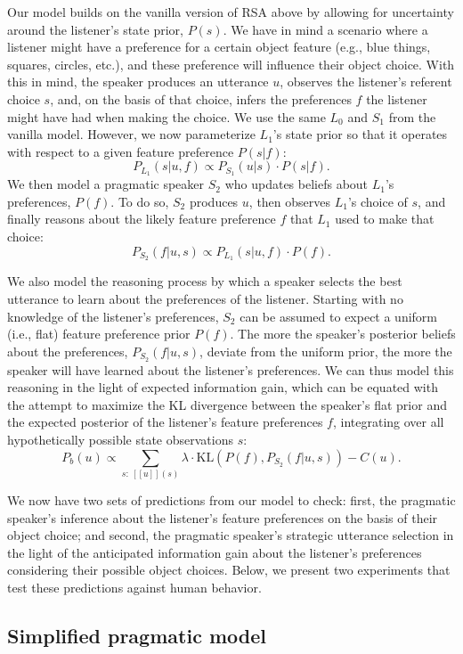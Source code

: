 \documentclass[10pt,a4paper]{article}
\begin{document}
Our model builds on the vanilla version of RSA above by allowing for uncertainty around the listener's state prior, $P(s)$. We have in mind a scenario where a listener might have a preference for a certain object feature (e.g., blue things, squares, circles, etc.), and these preference will influence their object choice. With this in mind, the speaker produces an utterance $u$, observes the listener's referent choice $s$, and, on the basis of that choice, infers the preferences $f$ the listener might have had when making the choice.
We use the same $L_0$ and $S_1$ from the vanilla model. However, we now parameterize $L_1$'s state prior so that it operates with respect to a given feature preference $P(s|f)$:
$$P_{L_{1}}(s|u,f) \propto P_{S_{1}}(u|s) \cdot P(s|f).$$
We then model a pragmatic speaker $S_2$ who updates beliefs about $L_1$'s preferences, $P(f)$. To do so, $S_2$ produces $u$, then observes $L_1$'s choice of $s$, and finally reasons about the likely feature preference $f$ that $L_1$ used to make that choice:
$$P_{S_{2}}(f|u,s) \propto P_{L_{1}}(s|u,f) \cdot P(f).$$

We also model the reasoning process by which a speaker selects the best utterance to learn about the preferences of the listener.
Starting with no knowledge of the listener's preferences, $S_2$ can be assumed to expect a uniform (i.e., flat) feature preference prior $P(f)$. The more the speaker's posterior beliefs about the preferences, $P_{S_{2}}(f|u,s)$, deviate from the uniform prior, the more the speaker will have learned about the listener's preferences. 
We can thus model this reasoning in the light of expected information gain, which can be equated with the attempt to maximize the KL divergence between the speaker's flat prior and the expected posterior of the listener's feature preferences $f$, integrating over all hypothetically possible state observations $s$:
$$P_{b}(u) \propto \sum_{s:\  [\![u]\!](s)}\lambda \cdot \textrm{KL}(P(f),P_{S_{2}}(f|u,s))-C(u).$$

We now have two sets of predictions from our model to check: first, the pragmatic speaker's inference about the listener's feature preferences on the basis of their object choice; and second, the pragmatic speaker's strategic utterance selection in the light of the anticipated information gain about the listener's preferences considering their possible object choices. Below, we present two experiments that test these predictions against human behavior.

\subsection{Simplified pragmatic model}
\end{document}
